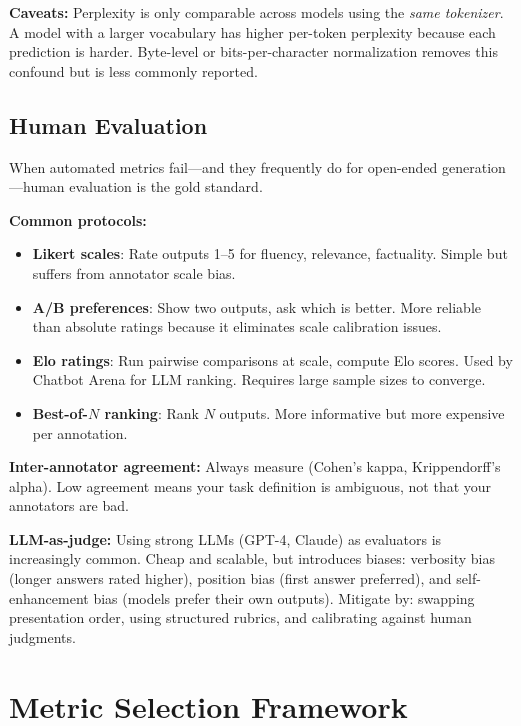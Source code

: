 \textbf{Caveats:} Perplexity is only comparable across models using the \textit{same tokenizer}. A model with a larger vocabulary has higher per-token perplexity because each prediction is harder. Byte-level or bits-per-character normalization removes this confound but is less commonly reported.

\subsection{Human Evaluation}

When automated metrics fail---and they frequently do for open-ended generation---human evaluation is the gold standard.

\textbf{Common protocols:}
\begin{itemize}
    \item \textbf{Likert scales}: Rate outputs 1--5 for fluency, relevance, factuality. Simple but suffers from annotator scale bias.
    \item \textbf{A/B preferences}: Show two outputs, ask which is better. More reliable than absolute ratings because it eliminates scale calibration issues.
    \item \textbf{Elo ratings}: Run pairwise comparisons at scale, compute Elo scores. Used by Chatbot Arena for LLM ranking. Requires large sample sizes to converge.
    \item \textbf{Best-of-$N$ ranking}: Rank $N$ outputs. More informative but more expensive per annotation.
\end{itemize}

\textbf{Inter-annotator agreement:} Always measure (Cohen's kappa, Krippendorff's alpha). Low agreement means your task definition is ambiguous, not that your annotators are bad.

\textbf{LLM-as-judge:} Using strong LLMs (GPT-4, Claude) as evaluators is increasingly common. Cheap and scalable, but introduces biases: verbosity bias (longer answers rated higher), position bias (first answer preferred), and self-enhancement bias (models prefer their own outputs). Mitigate by: swapping presentation order, using structured rubrics, and calibrating against human judgments.

\section{Metric Selection Framework}
\label{sec:metric_selection}

